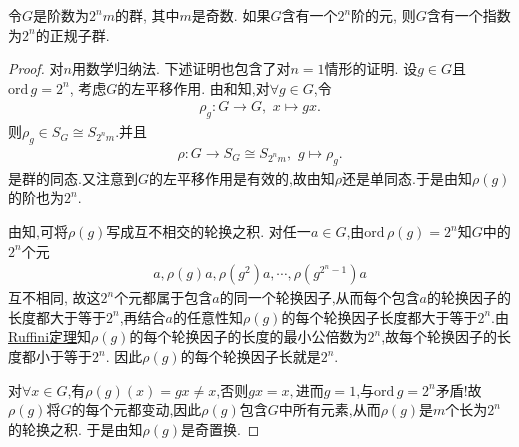 \documentclass[../../main.tex]{subfiles}%
\begin{document}
\begin{example}
令$G$是阶数为$2^n m$的群, 其中$m$是奇数. 如果$G$含有一个$2^n$阶的元, 则$G$含有一个指数为$2^n$的正规子群.
\end{example}
\begin{proof}
对$n$用数学归纳法. 下述证明也包含了对$n=1$情形的证明. 设$g \in G$且$\text{ord}\,g=2^n$, 考虑$G$的左平移作用. 由和知,对$\forall g\in G$,令
\begin{align*}
\rho_g: G\to G,\,\,x\mapsto gx.
\end{align*}
则$\rho_g\in S_G\cong S_{2^nm}$.并且
\begin{align*}
\rho: G \to S_G\cong S_{2^n m},\,\,g\mapsto \rho_g.
\end{align*}
是群的同态.又注意到$G$的左平移作用是有效的,故由知$\rho$还是单同态.于是由知$\rho(g)$的阶也为$2^n$.

由知,可将$\rho(g)$写成互不相交的轮换之积. 对任一$a \in G$,由$\text{ord}\,\rho(g)=2^n$知$G$中的$2^n$个元
\begin{align*}
a, \rho(g)a, \rho(g^2)a, \cdots, \rho(g^{2^n-1})a
\end{align*}
互不相同, 故这$2^n$个元都属于包含$a$的同一个轮换因子,从而每个包含$a$的轮换因子的长度都大于等于$2^n$,再结合$a$的任意性知$\rho(g)$的每个轮换因子长度都大于等于$2^n$.由\hyperref[theorem:抽象代数--Ruffini(鲁菲尼)定理]{Ruffini定理}知$\rho(g)$的每个轮换因子的长度的最小公倍数为$2^n$,故每个轮换因子的长度都小于等于$2^n$.
因此$\rho(g)$的每个轮换因子长就是$2^n$. 

对$\forall x\in G$,有$\rho(g)(x)=gx\neq x$,否则$gx=x,$进而$g=1$,与$\text{ord}\,g=2^n$矛盾!故$\rho(g)$将$G$的每个元都变动,因此$\rho(g)$包含$G$中所有元素,从而$\rho(g)$是$m$个长为$2^n$的轮换之积. 于是由知$\rho(g)$是奇置换.


\end{proof}
\end{document}
